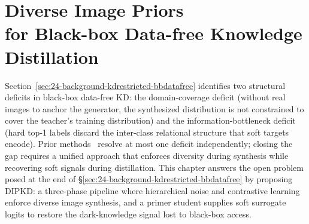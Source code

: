 \acresetall

\chapter[Diverse Image Priors for Black-box Data-free Knowledge Distillation]
{Diverse Image Priors \\ for Black-box Data-free Knowledge Distillation} \label{ch:40-research02}

\begin{foldable}
  Section~\ref{sec:24-background-kdrestricted-bbdatafree} identifies two structural deficits in black-box data-free \ac{KD}: the domain-coverage deficit (without real images to anchor the generator, the synthesized distribution is not constrained to cover the teacher's training distribution) and the information-bottleneck deficit (hard top-1 labels discard the inter-class relational structure that soft targets encode).
  Prior methods~\cite{wang2021zero, zhang2022ideal, yuan2024data} resolve at most one deficit independently; closing the gap requires a unified approach that enforces diversity during synthesis while recovering soft signals during distillation.
  This chapter answers the open problem posed at the end of \S\ref{sec:24-background-kdrestricted-bbdatafree} by proposing \acl{DIPKD}: a three-phase pipeline where hierarchical noise and contrastive learning enforce diverse image synthesis, and a primer student supplies soft surrogate logits to restore the dark-knowledge signal lost to black-box access.
\end{foldable}






